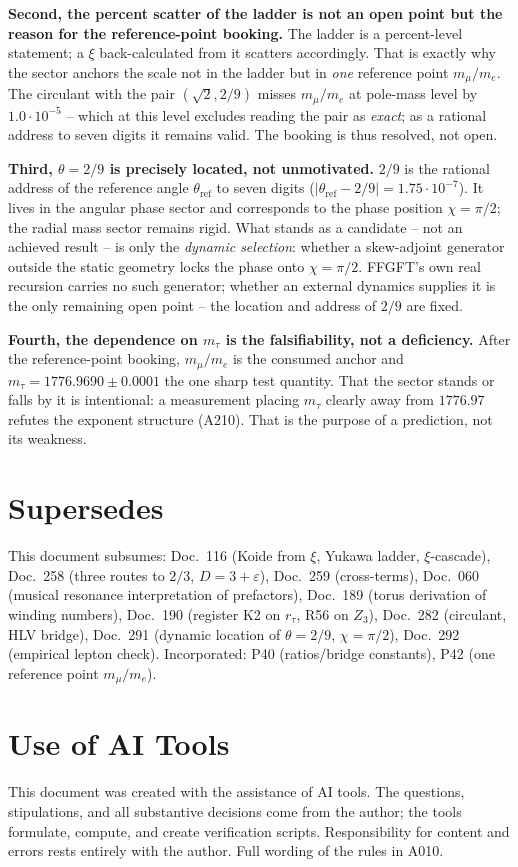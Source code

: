 \textbf{Second, the percent scatter of the ladder is not an open point but
the reason for the reference-point booking.} The ladder is a percent-level
statement; a $\xi$ back-calculated from it scatters accordingly. That is exactly
why the sector anchors the scale not in the ladder but in \emph{one}
reference point $m_\mu/m_e$. The circulant with the pair
$(\sqrt2, 2/9)$ misses $m_\mu/m_e$ at pole-mass level by $1{.}0\cdot10^{-5}$
-- which at this level excludes reading the pair as \emph{exact}; as a
rational address to seven digits it remains valid. The booking is thus
resolved, not open.

\textbf{Third, $\theta=2/9$ is precisely located, not unmotivated.} $2/9$
is the rational address of the reference angle $\theta_\text{ref}$ to seven
digits ($|\theta_\text{ref}-2/9| = 1{.}75\cdot10^{-7}$). It lives in the angular
phase sector and corresponds to the phase position $\chi=\pi/2$; the radial
mass sector remains rigid. What stands as a candidate -- not an achieved result
-- is only the \emph{dynamic selection}: whether a skew-adjoint generator outside
the static geometry locks the phase onto $\chi=\pi/2$. FFGFT's own real recursion
carries no such generator; whether an external dynamics supplies it is the only
remaining open point -- the location and address of $2/9$ are fixed.

\textbf{Fourth, the dependence on $m_\tau$ is the falsifiability, not a
deficiency.} After the reference-point booking, $m_\mu/m_e$ is the consumed
anchor and $m_\tau = 1776{.}9690\pm0{.}0001$ the one sharp test quantity. That
the sector stands or falls by it is intentional: a measurement placing $m_\tau$
clearly away from $1776{.}97$ refutes the exponent structure (A210). That is the
purpose of a prediction, not its weakness.

\section{Supersedes}

This document subsumes: Doc.~116 (Koide from $\xi$, Yukawa ladder, $\xi$-cascade),
Doc.~258 (three routes to $2/3$, $D=3+\varepsilon$), Doc.~259 (cross-terms),
Doc.~060 (musical resonance interpretation of prefactors), Doc.~189 (torus derivation of winding numbers), Doc.~190 (register K2 on $r_\tau$, R56 on $Z_3$), Doc.~282 (circulant, HLV bridge), Doc.~291 (dynamic location of $\theta=2/9$,
$\chi=\pi/2$), Doc.~292 (empirical lepton check).
Incorporated: P40 (ratios/bridge constants), P42 (one reference point $m_\mu/m_e$).

\section{Use of AI Tools}

This document was created with the assistance of AI tools. The questions,
stipulations, and all substantive decisions come from the author; the tools
formulate, compute, and create verification scripts.
Responsibility for content and errors rests entirely with the author.
Full wording of the rules in A010.
